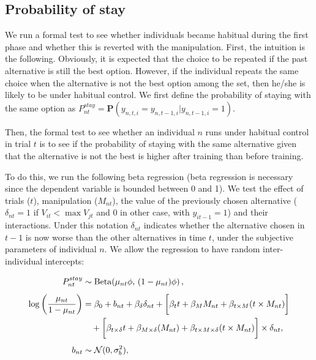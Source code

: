 \documentclass[man,natbib,floatsintext]{apa7}
\begin{document}
\subsection{Probability of stay}
We run a formal test to see whether individuals became habitual during the first phase and whether this is reverted with the manipulation. First, the intuition is the following. Obviously, it is expected that the choice to be repeated if the past alternative is still the best option. However, if the individual repeats the same choice when the alternative is not the best option among the set, then he/she is likely to be under habitual control. We first define the probability of staying with the same option as $P^{stay}_{nt}=\mathbf{P}(y_{n,t,i}=y_{n,t-1,i}|y_{n,t-1,i}=1)$.

Then, the formal test to see whether an individual $n$ runs under habitual control in trial $t$ is to see if the probability of staying with the same alternative given that the alternative is not the best is higher after training than before training. 


To do this, we run the following beta regression (beta regression is necessary since the dependent variable is bounded between 0 and 1). We test the effect of trials ($t$), manipulation ($M_{nt}$), the value of the previously chosen alternative ($\delta_{nt}=1$ if $V_{it}< \max{V_{jt}}$ and 0 in other case, with $y_{it-1}=1$)  and their interactions. Under this notation $\delta_{nt}$ indicates whether the alternative chosen in $t-1$ is now worse than the other alternatives in time $t$, under the subjective parameters of individual $n$. We allow the regression to have random inter-individual intercepts:

\begin{align}
P^{stay}_{nt} &\sim \operatorname{Beta}\!\left(\mu_{nt}\phi,\,
(1-\mu_{nt})\phi\right), \\[4pt]
\log\left(\frac{\mu_{nt}}{1-\mu_{nt}}\right)
&=
\beta_0
+ b_{nt}
+ \beta_{\delta} \delta_{nt}
+ \biggl[\beta_{t} t+\beta_M M_{nt}
+ \beta_{t \times  M} (t \times M_{nt}) \biggr]\notag\\
&\quad
+ \biggl[\beta_{t\times \delta} t+\beta_{M \times \delta } (M_{nt})
+ \beta_{t \times  M \times \delta} (t \times M_{nt}) \biggr]\times \delta_{nt}  ,
\\[4pt]
b_{nt} &\sim \mathcal{N}(0,\sigma_b^2),
\end{align}
\end{document}
